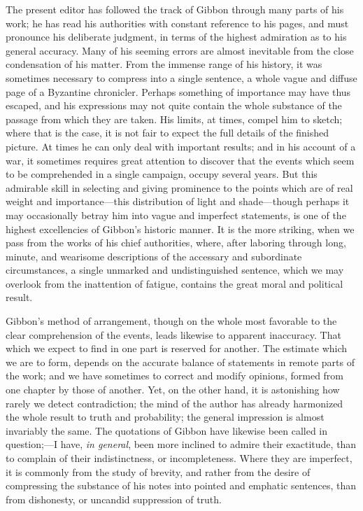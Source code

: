 The present editor has followed the track of Gibbon through many parts of his work; he has read his authorities with constant reference to his pages, and must pronounce his deliberate judgment, in terms of the highest admiration as to his general accuracy. Many of his seeming errors are almost inevitable from the close condensation of his matter. From the immense range of his history, it was sometimes necessary to compress into a single sentence, a whole vague and diffuse page of a Byzantine chronicler. Perhaps something of importance may have thus escaped, and his expressions may not quite contain the whole substance of the passage from which they are taken. His limits, at times, compel him to sketch; where that is the case, it is not fair to expect the full details of the finished picture. At times he can only deal with important results; and in his account of a war, it sometimes requires great attention to discover that the events which seem to be comprehended in a single campaign, occupy several years. But this admirable skill in selecting and giving prominence to the points which are of real weight and importance—this distribution of light and shade—though perhaps it may occasionally betray him into vague and imperfect statements, is one of the highest excellencies of Gibbon’s historic manner. It is the more striking, when we pass from the works of his chief authorities, where, after laboring through long, minute, and wearisome descriptions of the accessary and subordinate circumstances, a single unmarked and undistinguished sentence, which we may overlook from the inattention of fatigue, contains the great moral and political result.

Gibbon’s method of arrangement, though on the whole most favorable to the clear comprehension of the events, leads likewise to apparent inaccuracy. That which we expect to find in one part is reserved for another. The estimate which we are to form, depends on the accurate balance of statements in remote parts of the work; and we have sometimes to correct and modify opinions, formed from one chapter by those of another. Yet, on the other hand, it is astonishing how rarely we detect contradiction; the mind of the author has already harmonized the whole result to truth and probability; the general impression is almost invariably the same. The quotations of Gibbon have likewise been called in question;—I have, \textit{in general}, been more inclined to admire their exactitude, than to complain of their indistinctness, or incompleteness. Where they are imperfect, it is commonly from the study of brevity, and rather from the desire of compressing the substance of his notes into pointed and emphatic sentences, than from dishonesty, or uncandid suppression of truth.

